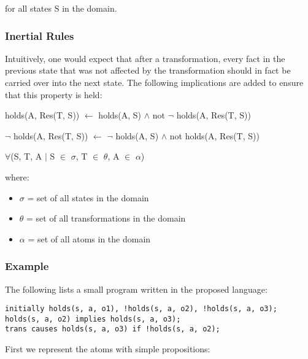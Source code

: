 \documentclass[a4paper]{article}
\begin{document}
        for all states S in the domain.

      \subsubsection{Inertial Rules}

        Intuitively, one would expect that after a transformation, every fact
        in the previous state that was not affected by the transformation
        should in fact be carried over into the next state. The following
        implications are added to ensure that this property is held:

        \begin{list}{}{}
          \item
            holds(A, Res(T, S)) $\leftarrow$ holds(A, S) $\land$ not $\lnot$ 
            holds(A, Res(T, S))
          \item 
            $\lnot$ holds(A, Res(T, S)) $\leftarrow$ $\lnot$ holds(A, S) 
            $\land$ not holds(A, Res(T, S))
        \end{list}

        $\forall$(S, T, A $\mid$ S $\in$ $\sigma$, T $\in$ $\theta$, A $\in$ 
        $\alpha$)

        where: 

        \begin{itemize}
          \item $\sigma$ = set of all states in the domain
          \item $\theta$ = set of all transformations in the domain
          \item $\alpha$ = set of all atoms in the domain
        \end{itemize}

      \subsubsection{Example}

        The following lists a small program written in the proposed language:

        \begin{verbatim}
initially holds(s, a, o1), !holds(s, a, o2), !holds(s, a, o3);
holds(s, a, o2) implies holds(s, a, o3);
trans causes holds(s, a, o3) if !holds(s, a, o2);
        \end{verbatim}

        First we represent the atoms with simple propositions:
\end{document}
